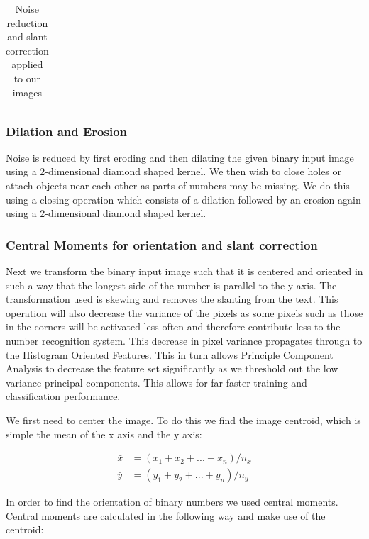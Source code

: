 \documentclass[%
        compressed,
        final,
        notitlepage,
        narroweqnarray,
        inline,
        twoside,
        ]{ieee}
\begin{document}
\begin{table}
\begin{tabular}{|c|c|}
        \hline
    \end{tabular}
    \label{tab:noise_reduction}
    \caption{Noise reduction and slant correction applied to our images}
\end{table}

\subsubsection{Dilation and Erosion}

Noise is reduced by first eroding and then dilating the given binary input image
using a 2-dimensional diamond shaped kernel. We then wish to close holes or
attach objects near each other
as parts of numbers may be missing. We do this using a closing operation which
consists of a dilation followed by an erosion again using a 2-dimensional diamond shaped kernel.

\subsubsection{Central Moments for orientation and slant correction}
Next we transform the binary input image such that it is centered and oriented in such a way that the longest side of the number is parallel to the y axis. The transformation used is skewing and removes the slanting from the text. This operation will also decrease the variance of the pixels as some pixels such as those in the corners will be activated less often and therefore contribute less to the number recognition system. This decrease in pixel variance propagates through to the Histogram Oriented Features. This in turn allows Principle Component Analysis to decrease the feature set significantly as we threshold out the low variance principal components. This allows for far faster training and classification performance.

We first need to center the image. To do this we find the image centroid, which is simple the mean of the x axis and the y axis:

\begin{align}
    \bar{x}&=(x_1+x_2+...+x_n)/n_x \\
    \bar{y}&=(y_1+y_2+...+y_n)/n_y
\end{align}

In order to find the orientation of binary numbers we used central moments. Central moments are calculated in the following way and make use of the centroid:
\end{document}
